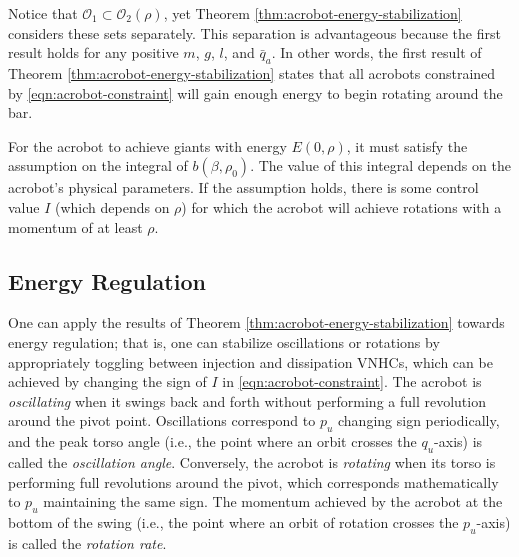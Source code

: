 \documentclass[journal,twoside,web, twocolumn,draftcls]{ieeecolor}
\begin{document}
Notice that \(\mathcal{O}_1 \subset \mathcal{O}_2(\rho)\), yet
Theorem \ref{thm:acrobot-energy-stabilization} considers these sets separately.
This separation is advantageous because the first result holds for any positive
\(m\), \(g\), \(l\), and \(\bar{q}_a\). 
In other words, the first result of Theorem
\ref{thm:acrobot-energy-stabilization} states that all acrobots constrained by
\eqref{eqn:acrobot-constraint} will gain enough energy to begin rotating around
the bar.

For the acrobot to achieve giants with energy
\(E(0,\rho)\), it must satisfy the assumption on the integral
of \(b(\beta,\rho_0)\). 
The value of this integral depends on the acrobot's physical parameters.
If the assumption holds, there is some control value \(I\)
(which depends on \(\rho\)) for which the acrobot will 
achieve rotations with a momentum of at least \(\rho\).

\subsection{Energy Regulation}\label{sec:energy-reg}
One can apply the results of Theorem \ref{thm:acrobot-energy-stabilization} 
towards energy regulation; 
that is, one can stabilize oscillations or rotations by appropriately toggling
between injection and dissipation VNHCs, which can be achieved by changing the
sign of \(I\) in \eqref{eqn:acrobot-constraint}.
The acrobot is \textit{oscillating} when it swings back and forth without
performing a full revolution around the pivot point.
Oscillations correspond to \(p_u\) changing sign periodically, and the peak
torso angle (i.e., the point where an orbit crosses the \(q_u\)-axis)
is called the \textit{oscillation angle}.
Conversely, the acrobot is \textit{rotating} when its torso is performing full
revolutions around the pivot, which corresponds mathematically to \(p_u\)
maintaining the same sign.
The momentum achieved by the acrobot at the bottom of the swing
(i.e., the point where an orbit of rotation crosses the \(p_u\)-axis) is
called the \textit{rotation rate}.
\end{document}
